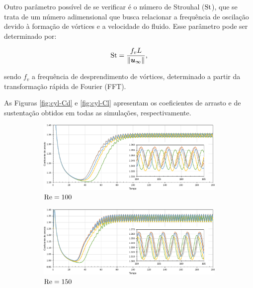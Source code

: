 Outro parâmetro possível de se verificar é o número de Strouhal ($\mathrm{St}$), que se trata de um número adimensional que busca relacionar a frequência de oscilação devido à formação de vórtices e a velocidade do fluido. Esse parâmetro pode ser determinado por:

\begin{equation}
    \mathrm{St}=\frac{f_vL}{\left\lVert{\boldsymbol{u}_\infty}\right\lVert}\text{,}
\end{equation}

\noindent sendo $f_v$ a frequência de desprendimento de vórtices, determinado a partir da transformação rápida de Fourier (FFT).

As Figuras \ref{fig:cyl-Cd} e \ref{fig:cyl-Cl} apresentam os coeficientes de arrasto e de sustentação obtidos em todas as simulações, respectivamente.

\begin{figure}[h!]
    \centering
    \caption{Escoamento sobre cilindro - Coeficiente de arrasto ao longo do tempo.}
    \begin{subfigure}{\textwidth}
        \includegraphics[width=\linewidth]{Figuras/cylinder/analise3/Cd-100.pdf}
        \caption{$\mathrm{Re}=100$}
    \end{subfigure}
    \begin{subfigure}{\textwidth}
        \includegraphics[width=\linewidth]{Figuras/cylinder/analise3/Cd-150.pdf}
        \caption{$\mathrm{Re}=150$}
    \end{subfigure}
    \begin{subfigure}{\textwidth}

\end{subfigure}
\end{figure}
